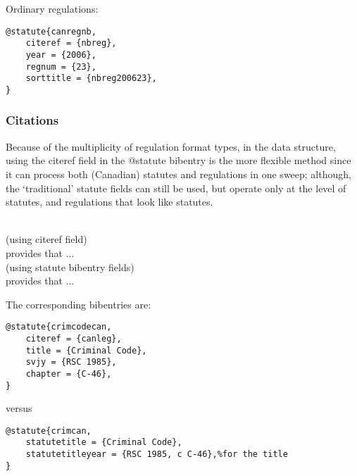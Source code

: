 Ordinary regulations: \par\bigskip
\begin{verbatim}
@statute{canregnb,
	citeref = {nbreg},
	year = {2006},
	regnum = {23},
	sorttitle = {nbreg200623},
}

\end{verbatim}

\subsubsection{Citations}



\par\bigskip
{}\par\bigskip
{}\par\bigskip
{}\par\bigskip

Because of the multiplicity of regulation format types, in the data structure, using the citeref field in the @statute bibentry is the more flexible method since it can process both (Canadian) statutes and regulations in one sweep; although, the `traditional' statute fields can still be used, but operate only at the level of statutes, and regulations that look like statutes.

\ \\
(using citeref field)\\
  provides that ...\\
(using statute bibentry fields) \\
 provides that ...
\par\bigskip

The corresponding bibentries are:

\begin{verbatim}
@statute{crimcodecan,
	citeref = {canleg},
	title = {Criminal Code},
	svjy = {RSC 1985},
	chapter = {C-46},
}

\end{verbatim}

versus

\begin{verbatim}
@statute{crimcan,
	statutetitle = {Criminal Code},
	statutetitleyear = {RSC 1985, c C-46},%for the title
}
\end{verbatim}


